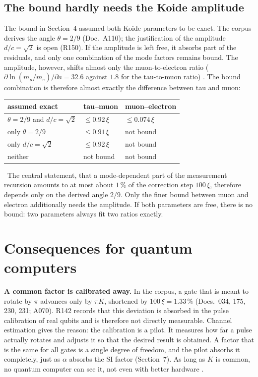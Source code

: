 \subsection{The bound hardly needs the Koide amplitude}

The bound in Section~4 assumed both Koide parameters to be exact. The corpus derives the angle
$\theta=2/9$ (Doc.~A110); the justification of the amplitude $d/c=\sqrt2$ is open (R150). If the
amplitude is left free, it absorbs part of the residuals, and only one combination of the mode factors
remains bound. The amplitude, however, shifts almost only the muon-to-electron ratio
($\partial\ln(m_\mu/m_e)/\partial a=32.6$ against $1.8$ for the tau-to-muon ratio) \KM. The bound
combination is therefore almost exactly the difference between tau and muon:

\begin{center}
\begin{tabular}{@{}lll@{}}
\toprule
\textbf{assumed exact} & \textbf{tau--muon} & \textbf{muon--electron}\\
\midrule
$\theta=2/9$ and $d/c=\sqrt2$ & $\le0.92\,\xi$ & $\le0.074\,\xi$\\
only $\theta=2/9$ & $\le0.91\,\xi$ & not bound\\
only $d/c=\sqrt2$ & $\le0.92\,\xi$ & not bound\\
neither & not bound & not bound\\
\bottomrule
\end{tabular}
\end{center}
\KM\ The central statement, that a mode-dependent part of the measurement recursion amounts to at most
about $1\,\%$ of the correction step $100\,\xi$, therefore depends only on the derived angle $2/9$. Only
the finer bound between muon and electron additionally needs the amplitude. If both parameters are
free, there is no bound: two parameters always fit two ratios exactly.

\section{Consequences for quantum computers}

\textbf{A common factor is calibrated away.} In the corpus, a gate that is meant to rotate by $\pi$
advances only by $\pi K$, shortened by $100\,\xi=1.33\,\%$ (Docs.~034, 175, 230, 231; A070). R142
records that this deviation is absorbed in the pulse calibration of real qubits and is therefore not
directly measurable. Channel estimation gives the reason: the calibration is a pilot. It measures how
far a pulse actually rotates and adjusts it so that the desired result is obtained. A factor that is
the same for all gates is a single degree of freedom, and the pilot absorbs it completely, just as
$\alpha$ absorbs the SI factor (Section~7). As long as $K$ is common, no quantum computer can see it,
not even with better hardware \BM.

